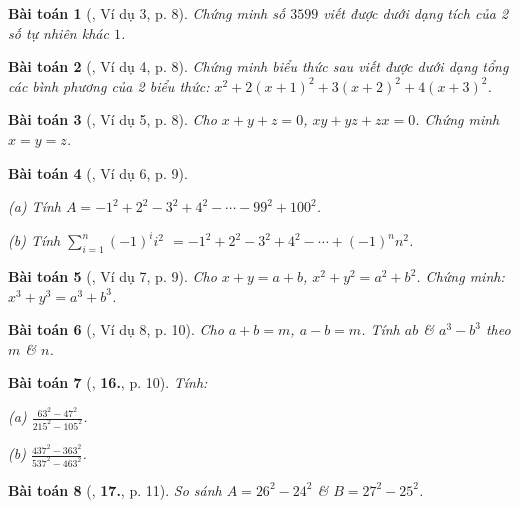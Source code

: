 \documentclass{article}
\numberwithin{equation}{section}
\newtheorem{baitoan}{Bài toán}[section]
\begin{document}
\begin{baitoan}[\cite{Binh_Toan_8_tap_1}, Ví dụ 3, p. 8]
	Chứng minh số $3599$ viết được dưới dạng tích của 2 số tự nhiên khác $1$.
\end{baitoan}

\begin{baitoan}[\cite{Binh_Toan_8_tap_1}, Ví dụ 4, p. 8]
	Chứng minh biểu thức sau viết được dưới dạng tổng các bình phương của 2 biểu thức: $x^2 + 2(x + 1)^2 + 3(x + 2)^2 + 4(x + 3)^2$.
\end{baitoan}

\begin{baitoan}[\cite{Binh_Toan_8_tap_1}, Ví dụ 5, p. 8]
	Cho $x + y + z = 0$, $xy + yz + zx = 0$. Chứng minh $x = y = z$.
\end{baitoan}

\begin{baitoan}[\cite{Binh_Toan_8_tap_1}, Ví dụ 6, p. 9]
	\begin{enumerate*}
		\item[(a)] Tính $A = -1^2 + 2^2 - 3^2 + 4^2 - \cdots - 99^2 + 100^2$.
		\item[(b)] Tính $\sum_{i=1}^n (-1)^ii^2$ $= -1^2 + 2^2 - 3^2 + 4^2 - \cdots + (-1)^nn^2$.
	\end{enumerate*}
\end{baitoan}

\begin{baitoan}[\cite{Binh_Toan_8_tap_1}, Ví dụ 7, p. 9]
	Cho $x + y = a + b$, $x^2 + y^2 = a^2 + b^2$. Chứng minh: $x^3 + y^3 = a^3 + b^3$.
\end{baitoan}

\begin{baitoan}[\cite{Binh_Toan_8_tap_1}, Ví dụ 8, p. 10]
	Cho $a + b = m$, $a - b = m$. Tính $ab$ \& $a^3 - b^3$ theo $m$ \& $n$.
\end{baitoan}

\begin{baitoan}[\cite{Binh_Toan_8_tap_1}, \textbf{16.}, p. 10]
	Tính:
	\begin{enumerate*}
		\item[(a)] $\frac{63^2 - 47^2}{215^2 - 105^2}$.
		\item[(b)] $\frac{437^2 - 363^2}{537^2 - 463^2}$.
	\end{enumerate*}
\end{baitoan}

\begin{baitoan}[\cite{Binh_Toan_8_tap_1}, \textbf{17.}, p. 11]
	So sánh $A = 26^2 - 24^2$ \& $B = 27^2 - 25^2$.
\end{baitoan}
\end{document}
